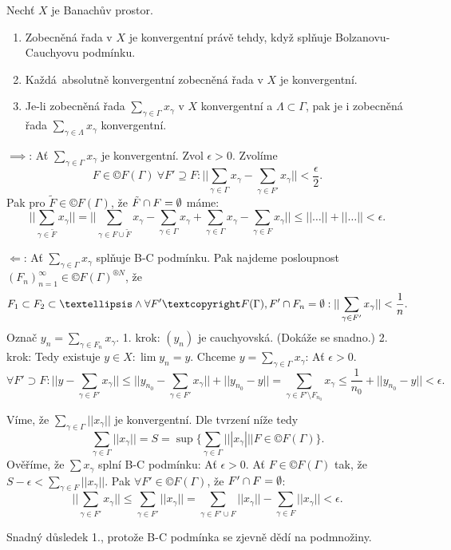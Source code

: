 \documentclass[12pt]{article}					%
\begin{document}
\begin{veta}
	Nechť $X$ je Banachův prostor.
	
	\begin{enumerate}
		\item Zobecněná řada v $X$ je konvergentní právě tehdy, když splňuje Bolzanovu-Cauchyovu podmínku.
		\item Každá absolutně konvergentní zobecněná řada v $X$ je konvergentní.
		\item Je-li zobecněná řada $\sum_{\gamma \in \Gamma} x_\gamma$ v $X$ konvergentní a $\Lambda \subset \Gamma$, pak je i zobecněná řada $\sum_{\gamma \in \Lambda} x_\gamma$ konvergentní.
	\end{enumerate}

	\begin{dukazin}[1.]
		$\implies$: Ať $\sum_{\gamma \in \Gamma} x_\gamma$ je konvergentní. Zvol $\epsilon > 0$. Zvolíme 
		$$ F \in ©F(\Gamma)\ \forall F' \supseteq F: ||\sum_{\gamma \in \Gamma}x_\gamma - \sum_{\gamma \in F'}x_\gamma|| < \frac{\epsilon}{2}. $$
		Pak pro $\tilde{F} \in ©F(\Gamma)$, že $\tilde{F} \cap F = \emptyset$ máme:
		$$ ||\sum_{\gamma \in \tilde{F}} x_\gamma|| = ||\sum_{\gamma \in F \cup \tilde{F}} x_\gamma - \sum_{\gamma \in \Gamma} x_\gamma + \sum_{\gamma \in \Gamma} x_\gamma - \sum_{\gamma \in F} x_\gamma|| ≤ ||…|| + ||…|| < \epsilon. $$

		$\Leftarrow$: Ať $\sum_{\gamma \in \Gamma} x_\gamma$ splňuje B-C podmínku. Pak najdeme posloupnost $(F_n)_{n=1}^∞ \in ©F(\Gamma)^{®N}$, že
		$$ F_1 \subset F_2 \subset … \land \forall F' ©F(\Gamma), F' \cap F_n = \O: ||\sum_{\gamma \in F'} x_{\gamma}|| < \frac{1}{n}. $$
		Označ $y_n = \sum_{\gamma \in F_n} x_\gamma$.
		1. krok: $(y_n)$ je cauchyovská. (Dokáže se snadno.) 2. krok: Tedy existuje $y \in X: \lim y_n = y$. Chceme $y = \sum_{\gamma \in \Gamma} x_\gamma$: Ať $\epsilon > 0$. 
		$$ \forall F' \supset F: ||y  - \sum_{\gamma \in F'} x_\gamma|| ≤ ||y_{n_0} - \sum_{\gamma \in F'} x_\gamma|| + ||y_{n_0} - y|| = \sum_{\gamma \in F' \setminus F_{n_0}} x_\gamma ≤ \frac{1}{n_0} + ||y_{n_0} - y|| < \epsilon. $$
	\end{dukazin}

	\begin{dukazin}[2.]
		Víme, že $\sum_{\gamma \in \Gamma}||x_\gamma||$ je konvergentní. Dle tvrzení níže tedy
		$$ \sum_{\gamma \in \Gamma}||x_\gamma|| = S = \sup\{\sum_{\gamma \in \Gamma} | ||x_\gamma|| | F \in ©F(\Gamma)\}. $$
		Ověříme, že $\sum x_\gamma$ splní B-C podmínku: Ať $\epsilon > 0$. Ať $F \in ©F(\Gamma)$ tak, že $S - \epsilon < \sum_{\gamma \in F}||x_\gamma||$. Pak $\forall F' \in ©F(\Gamma)$, že $F' \cap F = \emptyset$:
		$$ ||\sum_{\gamma \in F'} x_\gamma || ≤ \sum_{\gamma \in F'} || x_\gamma || = \sum_{\gamma \in F' \cup F} ||x_\gamma|| - \sum_{\gamma \in F} ||x_\gamma|| < \epsilon. $$
	\end{dukazin}

	\begin{dukazin}[3.]
		Snadný důsledek 1., protože B-C podmínka se zjevně dědí na podmnožiny.
	\end{dukazin}
\end{veta}
\end{document}
